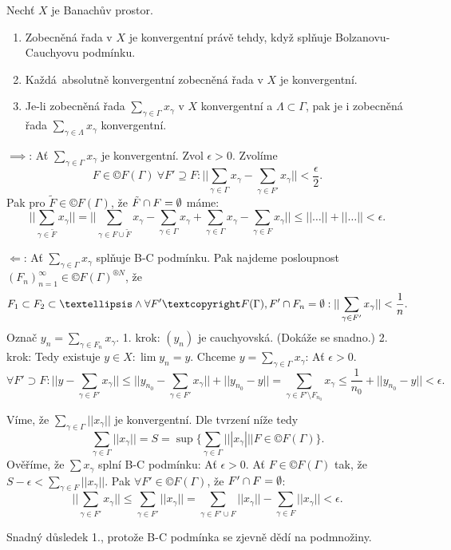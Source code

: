 \documentclass[12pt]{article}					%
\begin{document}
\begin{veta}
	Nechť $X$ je Banachův prostor.
	
	\begin{enumerate}
		\item Zobecněná řada v $X$ je konvergentní právě tehdy, když splňuje Bolzanovu-Cauchyovu podmínku.
		\item Každá absolutně konvergentní zobecněná řada v $X$ je konvergentní.
		\item Je-li zobecněná řada $\sum_{\gamma \in \Gamma} x_\gamma$ v $X$ konvergentní a $\Lambda \subset \Gamma$, pak je i zobecněná řada $\sum_{\gamma \in \Lambda} x_\gamma$ konvergentní.
	\end{enumerate}

	\begin{dukazin}[1.]
		$\implies$: Ať $\sum_{\gamma \in \Gamma} x_\gamma$ je konvergentní. Zvol $\epsilon > 0$. Zvolíme 
		$$ F \in ©F(\Gamma)\ \forall F' \supseteq F: ||\sum_{\gamma \in \Gamma}x_\gamma - \sum_{\gamma \in F'}x_\gamma|| < \frac{\epsilon}{2}. $$
		Pak pro $\tilde{F} \in ©F(\Gamma)$, že $\tilde{F} \cap F = \emptyset$ máme:
		$$ ||\sum_{\gamma \in \tilde{F}} x_\gamma|| = ||\sum_{\gamma \in F \cup \tilde{F}} x_\gamma - \sum_{\gamma \in \Gamma} x_\gamma + \sum_{\gamma \in \Gamma} x_\gamma - \sum_{\gamma \in F} x_\gamma|| ≤ ||…|| + ||…|| < \epsilon. $$

		$\Leftarrow$: Ať $\sum_{\gamma \in \Gamma} x_\gamma$ splňuje B-C podmínku. Pak najdeme posloupnost $(F_n)_{n=1}^∞ \in ©F(\Gamma)^{®N}$, že
		$$ F_1 \subset F_2 \subset … \land \forall F' ©F(\Gamma), F' \cap F_n = \O: ||\sum_{\gamma \in F'} x_{\gamma}|| < \frac{1}{n}. $$
		Označ $y_n = \sum_{\gamma \in F_n} x_\gamma$.
		1. krok: $(y_n)$ je cauchyovská. (Dokáže se snadno.) 2. krok: Tedy existuje $y \in X: \lim y_n = y$. Chceme $y = \sum_{\gamma \in \Gamma} x_\gamma$: Ať $\epsilon > 0$. 
		$$ \forall F' \supset F: ||y  - \sum_{\gamma \in F'} x_\gamma|| ≤ ||y_{n_0} - \sum_{\gamma \in F'} x_\gamma|| + ||y_{n_0} - y|| = \sum_{\gamma \in F' \setminus F_{n_0}} x_\gamma ≤ \frac{1}{n_0} + ||y_{n_0} - y|| < \epsilon. $$
	\end{dukazin}

	\begin{dukazin}[2.]
		Víme, že $\sum_{\gamma \in \Gamma}||x_\gamma||$ je konvergentní. Dle tvrzení níže tedy
		$$ \sum_{\gamma \in \Gamma}||x_\gamma|| = S = \sup\{\sum_{\gamma \in \Gamma} | ||x_\gamma|| | F \in ©F(\Gamma)\}. $$
		Ověříme, že $\sum x_\gamma$ splní B-C podmínku: Ať $\epsilon > 0$. Ať $F \in ©F(\Gamma)$ tak, že $S - \epsilon < \sum_{\gamma \in F}||x_\gamma||$. Pak $\forall F' \in ©F(\Gamma)$, že $F' \cap F = \emptyset$:
		$$ ||\sum_{\gamma \in F'} x_\gamma || ≤ \sum_{\gamma \in F'} || x_\gamma || = \sum_{\gamma \in F' \cup F} ||x_\gamma|| - \sum_{\gamma \in F} ||x_\gamma|| < \epsilon. $$
	\end{dukazin}

	\begin{dukazin}[3.]
		Snadný důsledek 1., protože B-C podmínka se zjevně dědí na podmnožiny.
	\end{dukazin}
\end{veta}
\end{document}
